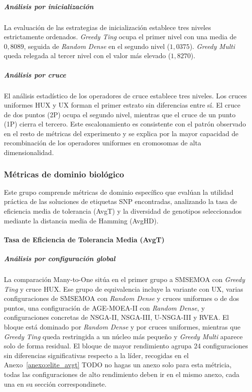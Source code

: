 \subparagraph{Análisis por inicialización}

La evaluación de las estrategias de inicialización establece tres niveles estrictamente ordenados. \textit{Greedy Ting} ocupa el primer nivel con una media de $0{,}8089$, seguida de \textit{Random Dense} en el segundo nivel ($1{,}0375$). \textit{Greedy Multi} queda relegada al tercer nivel con el valor más elevado ($1{,}8270$).

\subparagraph{Análisis por cruce}

El análisis estadístico de los operadores de cruce establece tres niveles. Los cruces uniformes HUX y UX forman el primer estrato sin diferencias entre sí. El cruce de dos puntos (2P) ocupa el segundo nivel, mientras que el cruce de un punto (1P) cierra el tercero. Este escalonamiento es consistente con el patrón observado en el resto de métricas del experimento y se explica por la mayor capacidad de recombinación de los operadores uniformes en cromosomas de alta dimensionalidad.


\subsubsection{Métricas de dominio biológico}

Este grupo comprende métricas de dominio específico que evalúan la utilidad práctica de las soluciones de etiquetas SNP encontradas, analizando la tasa de eficiencia media de tolerancia (AvgT) y la diversidad de genotipos seleccionados mediante la distancia media de Hamming (AvgHD).

\paragraph{Tasa de Eficiencia de Tolerancia Media (AvgT)}

\subparagraph{Análisis por configuración global}

La comparación Many-to-One sitúa en el primer grupo a SMSEMOA con \textit{Greedy Ting} y cruce HUX. Ese grupo de equivalencia incluye la variante con UX, varias configuraciones de SMSEMOA con \textit{Random Dense} y cruces uniformes o de dos puntos, una configuración de AGE-MOEA-II con \textit{Random Dense}, y configuraciones concretas de NSGA-II, NSGA-III, U-NSGA-III y RVEA. El bloque está dominado por \textit{Random Dense} y por cruces uniformes, mientras que \textit{Greedy Ting} queda restringida a un núcleo más pequeño y \textit{Greedy Multi} aparece solo de forma residual. El bloque de mayor rendimiento agrupa 24 configuraciones sin diferencias significativas respecto a la líder, recogidas en el Anexo~\ref{anexo:elite_avgt} TODO no hagas un anexo solo para esta métricia, todas las configuraciones de alto rendimiento deben ir en el mismo anexo, cada una en su sección correspondinete.

